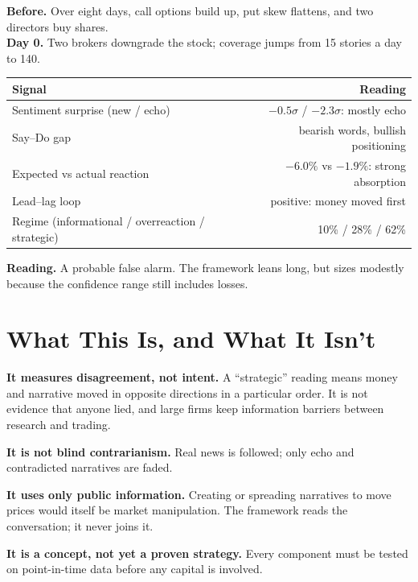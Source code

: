 \documentclass[11pt,a4paper]{article}
\begin{document}
\begin{tcolorbox}[enhanced,breakable,colback=gray!4,colframe=gray!55!black,boxrule=0.6pt,arc=2pt,
  fonttitle=\bfseries\small,title={Illustration: a hypothetical downgrade},left=8pt,right=8pt]
\small
\textbf{Before.} Over eight days, call options build up, put skew flattens, and two directors buy shares.\\
\textbf{Day 0.} Two brokers downgrade the stock; coverage jumps from 15 stories a day to 140.

\begin{tabularx}{\linewidth}{@{}Xr@{}}
\toprule
Signal & Reading \\
\midrule
Sentiment surprise (new / echo) & $-0.5\sigma$ / $-2.3\sigma$: mostly echo \\
Say--Do gap & bearish words, bullish positioning \\
Expected vs actual reaction & $-6.0\%$ vs $-1.9\%$: strong absorption \\
Lead--lag loop & positive: money moved first \\
Regime (informational / overreaction / strategic) & 10\% / 28\% / 62\% \\
\bottomrule
\end{tabularx}

\textbf{Reading.} A probable false alarm. The framework leans long, but sizes modestly because the confidence range still includes losses.
\end{tcolorbox}

\section{What This Is, and What It Isn't}

\textbf{It measures disagreement, not intent.} A ``strategic'' reading means money and narrative moved in opposite directions in a particular order. It is not evidence that anyone lied, and large firms keep information barriers between research and trading.

\textbf{It is not blind contrarianism.} Real news is followed; only echo and contradicted narratives are faded.

\textbf{It uses only public information.} Creating or spreading narratives to move prices would itself be market manipulation. The framework reads the conversation; it never joins it.

\textbf{It is a concept, not yet a proven strategy.} Every component must be tested on point-in-time data before any capital is involved.
\end{document}
